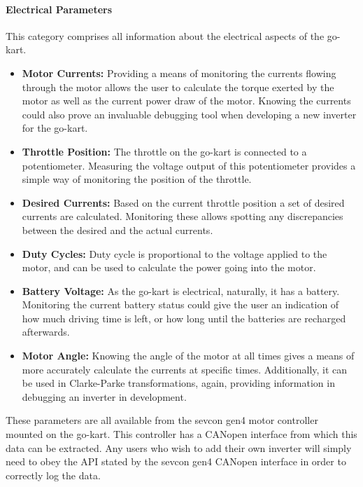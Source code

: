 \paragraph*{Electrical Parameters}
This category comprises all information about the electrical aspects of the go-kart.
\begin{itemize}
	\item \textbf{Motor Currents:} Providing a means of monitoring the currents flowing through the motor allows the user to calculate the torque exerted by the motor as well as the current power draw of the motor.
	Knowing the currents could also prove an invaluable debugging tool when developing a new inverter for the go-kart.
	\item \textbf{Throttle Position:} The throttle on the go-kart is connected to a potentiometer.
	Measuring the voltage output of this potentiometer provides a simple way of monitoring the position of the throttle.
	\item \textbf{Desired Currents:} Based on the current throttle position a set of desired currents are calculated.
	Monitoring these allows spotting any discrepancies between the desired and the actual currents.
	\item \textbf{Duty Cycles:} Duty cycle is proportional to the voltage applied to the motor, and can be used to calculate the power going into the motor.
	\item \textbf{Battery Voltage:} As the go-kart is electrical, naturally, it has a battery.
	Monitoring the current battery status could give the user an indication of how much driving time is left, or how long until the batteries are recharged afterwards.
	\item \textbf{Motor Angle:} Knowing the angle of the motor at all times gives a means of more accurately calculate the currents at specific times.
	Additionally, it can be used in Clarke-Parke transformations, again, providing information in debugging an inverter in development.
\end{itemize}
These parameters are all available from the sevcon gen4 motor controller mounted on the go-kart.
This controller has a CANopen interface from which this data can be extracted.
Any users who wish to add their own inverter will simply need to obey the API stated by the sevcon gen4 CANopen interface in order to correctly log the data.
